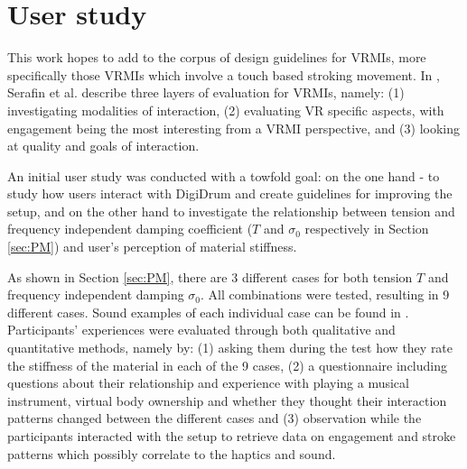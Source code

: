     \section{User study}\label{sec:exp}
    
    This work hopes to add to the corpus of design guidelines for VRMIs, more specifically those VRMIs which involve a touch based stroking movement. In \cite{Serafin:2016}, Serafin et al. describe three layers of evaluation for VRMIs, namely: (1) investigating modalities of interaction, (2) evaluating VR specific aspects, with engagement being the most interesting from a VRMI perspective, and (3) looking at quality and goals of interaction.
    
    An initial user study was conducted with a towfold goal: on the one hand - to study how users interact with DigiDrum and create guidelines for improving the setup, and on the other hand to investigate the relationship between tension and frequency independent damping coefficient ($T$ and $\sigma_0$ respectively in Section \ref{sec:PM}) and user's perception of material stiffness.
    
    As shown in Section \ref{sec:PM}, there are 3 different cases for both tension $T$ and frequency independent damping $\sigma_0$. All combinations were tested, resulting in 9 different cases. Sound examples of each individual case can be found in \cite{soundfiles}. Participants' experiences were evaluated through both qualitative and quantitative methods, namely by: (1) asking them during the test how they rate the stiffness of the material in each of the 9 cases, (2) a questionnaire including questions about their relationship and experience with playing a musical instrument, virtual body ownership and whether they thought their interaction patterns changed between the different cases and (3) observation while the participants interacted with the setup to retrieve data on engagement and stroke patterns which possibly correlate to the haptics and sound.
    
